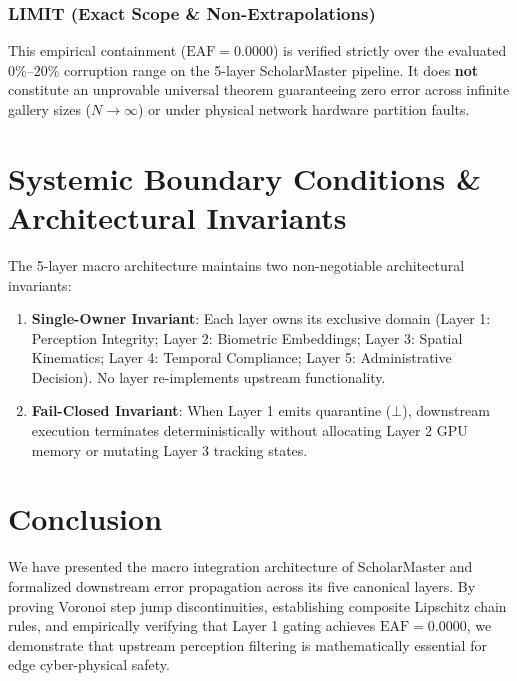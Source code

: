 \documentclass[conference]{IEEEtran}
\begin{document}
\subsubsection{LIMIT (Exact Scope \& Non-Extrapolations)}
This empirical containment ($\text{EAF} = 0.0000$) is verified strictly over the evaluated $0\%\text{--}20\%$ corruption range on the 5-layer ScholarMaster pipeline. It does \textbf{not} constitute an unprovable universal theorem guaranteeing zero error across infinite gallery sizes ($N \to \infty$) or under physical network hardware partition faults.

\section{Systemic Boundary Conditions \& Architectural Invariants}
The 5-layer macro architecture maintains two non-negotiable architectural invariants:
\begin{enumerate}
    \item \textbf{Single-Owner Invariant}: Each layer owns its exclusive domain (Layer 1: Perception Integrity; Layer 2: Biometric Embeddings; Layer 3: Spatial Kinematics; Layer 4: Temporal Compliance; Layer 5: Administrative Decision). No layer re-implements upstream functionality.
    \item \textbf{Fail-Closed Invariant}: When Layer 1 emits quarantine ($\bot$), downstream execution terminates deterministically without allocating Layer 2 GPU memory or mutating Layer 3 tracking states.
\end{enumerate}

\section{Conclusion}
We have presented the macro integration architecture of ScholarMaster and formalized downstream error propagation across its five canonical layers. By proving Voronoi step jump discontinuities, establishing composite Lipschitz chain rules, and empirically verifying that Layer 1 gating achieves $\text{EAF} = 0.0000$, we demonstrate that upstream perception filtering is mathematically essential for edge cyber-physical safety.
\end{document}
